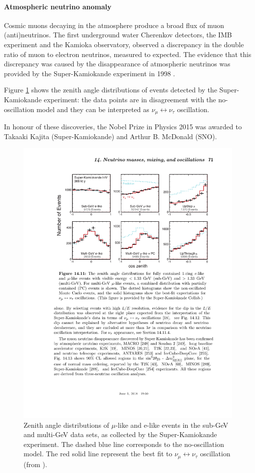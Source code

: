\paragraph{Atmospheric neutrino anomaly}
Cosmic muons decaying in the atmosphere produce a broad flux of muon (anti)neutrinos. The first underground water Cherenkov detectors, the IMB experiment and the Kamioka observatory, observed a discrepancy in the double ratio of muon to electron neutrinos, measured to expected. The evidence that this discrepancy was caused by the disappearance of atmospheric neutrinos was provided by the Super-Kamiokande experiment in 1998 \cite{Fukuda:1998mi}.

Figure \ref{fig:superk} shows the zenith angle distributions of events detected by the Super-Kamiokande experiment: the data points are in disagreement with the no-oscillation model and they can be interpreted as $\nu_{\mu} \leftrightarrow \nu_{\tau}$ oscillation.

In honour of these discoveries, the Nobel Prize in Physics 2015 was awarded to Takaaki Kajita (Super-Kamiokande) and Arthur B. McDonald (SNO). 

\begin{figure}[htbp]
    \centering
    \includegraphics[width=0.9\linewidth]{figures/superk.pdf}
    \caption{Zenith angle distributions of $\mu$-like and e-like events in the sub-GeV and multi-GeV data sets, as collected by the Super-Kamiokande experiment. The dashed blue line corresponds to the no-oscillation model. The red solid line represent the best fit to $\nu_{\mu} \leftrightarrow \nu_{\tau}$ oscillation (from \cite{PhysRevD.98.030001}).}
    \label{fig:superk}
\end{figure}

